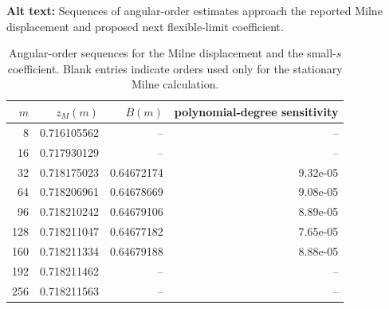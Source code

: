 \begin{table}[ht]
\centering
\caption{Angular-order sequences for the Milne displacement and the small-$s$ coefficient.  Blank entries indicate orders used only for the stationary Milne calculation.}
\par\raggedright\textbf{Alt text:} Sequences of angular-order estimates approach the reported Milne displacement and proposed next flexible-limit coefficient.\par\centering

\label{tab:milne_B}
\begin{tabular}{rrrr}
\toprule
$m$ & $z_M(m)$ & $B(m)$ & polynomial-degree sensitivity\\
\midrule
8 & 0.716105562 & -- & --\\
16 & 0.717930129 & -- & --\\
32 & 0.718175023 & 0.64672174 & 9.32e-05\\
64 & 0.718206961 & 0.64678669 & 9.08e-05\\
96 & 0.718210242 & 0.64679106 & 8.89e-05\\
128 & 0.718211047 & 0.64677182 & 7.65e-05\\
160 & 0.718211334 & 0.64679188 & 8.88e-05\\
192 & 0.718211462 & -- & --\\
256 & 0.718211563 & -- & --\\
\bottomrule
\end{tabular}
\end{table}
